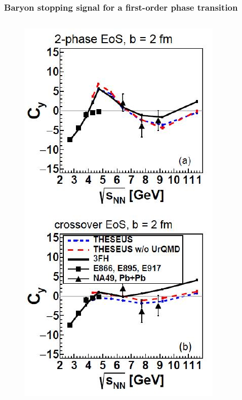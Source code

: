 \documentclass[dvipsnames] {beamer}
\begin{document}
\begin{frame}[shrink=35]
  \frametitle{{\small Baryon stopping signal for a first-order phase transition}}
  \begin{columns}[c]
    \begin{block}{}
      \begin{figure}[H]
        \includegraphics[width=.9\textwidth]{barStopping_curv.jpg}
      \end{figure}
    \end{block}
  

\end{columns}
\end{frame}
\end{document}
